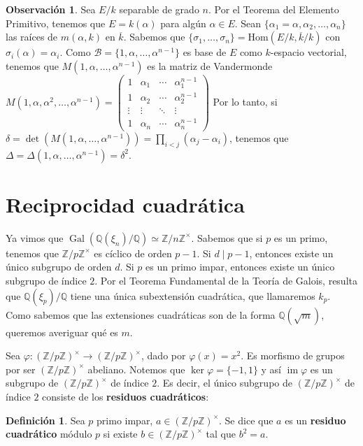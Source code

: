 \documentclass[12pt]{book}
\theoremstyle{definition}
\newtheorem{obs}[teo]{Observación}
\newtheorem{defn}[teo]{Definición}
\newcommand{\ZZ}{\mathbb{Z}}      %
\newcommand{\QQ}{\mathbb{Q}}
\renewcommand{\hom}{\mathrm{Hom}}
\DeclareMathOperator{\im}{im}
\DeclareMathOperator{\Gal}{Gal}
\begin{document}
\begin{obs}
Sea $E/k$ separable de grado $n$. Por el Teorema del Elemento Primitivo, tenemos que $E=k(\alpha)$ para algún $\alpha\in E$. Sean $\{\alpha_1=\alpha,\alpha_2,\ldots , \alpha_n\}$ las raíces de $m(\alpha,k)$ en $\overline{k}$. Sabemos que $\{\sigma_1,\ldots,\sigma_n\}=\hom(E/k,\overline{k}/k)$ con $\sigma_i(\alpha)=\alpha_i$. Como $\mathscr{B} = \{1,\alpha,\ldots , \alpha^{n-1}\}$ es base de $E$ como $k$-espacio vectorial, tenemos que $M(1,\alpha,\ldots , \alpha^{n-1})$ es la matriz de Vandermonde $M(1,\alpha,\alpha^2, \ldots , \alpha^{n-1}) =\begin{pmatrix}1 & \alpha_1 & \cdots & \alpha_1^{n-1} \\ 1 & \alpha_2 & \cdots & \alpha_2^{n-1} \\ \vdots & \vdots & \ddots & \vdots \\ 1 & \alpha_n & \cdots & \alpha_n^{n-1}\end{pmatrix}$ Por lo tanto, si $\delta = \det(M(1,\alpha,\ldots , \alpha^{n-1})) = \displaystyle\prod_{i<j}(\alpha_j - \alpha_i)$, tenemos que $\Delta = \Delta(1,\alpha,\ldots,\alpha^{n-1}) = \delta^2$.
\end{obs}

\section{Reciprocidad cuadrática}

Ya vimos que $\Gal(\QQ(\xi_n)/\QQ)\simeq \ZZ/n\ZZ^\times$. Sabemos que si $p$ es un primo, tenemos que $\ZZ/p\ZZ^\times$ es cíclico de orden $p-1$. Si $d\mid p-1$, entonces existe un único subgrupo de orden $d$. Si $p$ es un primo impar, entonces existe un único subgrupo de índice $2$. Por el Teorema Fundamental de la Teoría de Galois, resulta que $\QQ(\xi_p)/\QQ$ tiene una única subextensión cuadrática, que llamaremos $k_p$. Como sabemos que las extensiones cuadráticas son de la forma $\QQ(\sqrt{m})$, queremos averiguar qué es $m$.

Sea $\varphi:(\ZZ/p\ZZ)^\times \to (\ZZ/p\ZZ)^\times$, dado por $\varphi(x)=x^2$. Es morfismo de grupos por ser $(\ZZ/p\ZZ)^\times$ abeliano. Notemos que $\ker\varphi = \{-1,1\}$ y así $\im\varphi$ es un subgrupo de $(\ZZ/p\ZZ)^\times$ de índice $2$. Es decir, el único subgrupo de $(\ZZ/p\ZZ)^\times$ de índice $2$ consiste de los \textbf{residuos cuadráticos}:

\begin{defn}
Sea $p$ primo impar, $a\in(\ZZ/p\ZZ)^\times$. Se dice que $a$ es un \textbf{residuo cuadrático} módulo $p$ si existe $b\in(\ZZ/p\ZZ)^\times$ tal que $b^2 = a$.
\end{defn}
\end{document}
